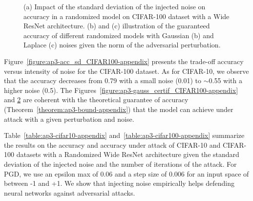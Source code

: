 \begin{figure}[htb]
\begin{subfigure}[t]{0.31\textwidth}
    \caption{}
    \label{figure:ap3-laplace_certif_CIFAR100-appendix}
  \end{subfigure}
  \caption{(a) Impact of the standard deviation of the injected noise on accuracy in a randomized model on CIFAR-100 dataset with a Wide ResNet architecture. (b) and (c) illustration of the guaranteed accuracy of different randomized models with Gaussian (b) and Laplace (c) noises given the norm of the adversarial perturbation.}
\end{figure}

Figure~\ref{figure:ap3-acc_sd_CIFAR100-appendix} presents the trade-off accuracy versus intensity of noise for the CIFAR-100 dataset. As for CIFAR-10, we observe that the accuracy decreases from 0.79 with a small noise (0.01) to $\sim$0.55 with a higher noise (0.5). The Figures~\ref{figure:ap3-gauss_certif_CIFAR100-appendix} and \ref{figure:ap3-laplace_certif_CIFAR100-appendix} are coherent with the theoretical guarantee of accuracy (Theorem~\ref{theorem:ap3-bound-appendix}) that the model can achieve under attack with a given perturbation and noise.   


Table~\ref{table:ap3-cifar10-appendix} and~\ref{table:ap3-cifar100-appendix} summarize the results on the accuracy and accuracy under attack of CIFAR-10 and CIFAR-100 datasets with a Randomized Wide ResNet architecture given the standard deviation of the injected noise and the number of iterations of the attack. For PGD, we use an epsilon max of 0.06 and a step size of 0.006 for an input space of between -1 and +1. We show that injecting noise empirically helps defending neural networks against adversarial attacks.


